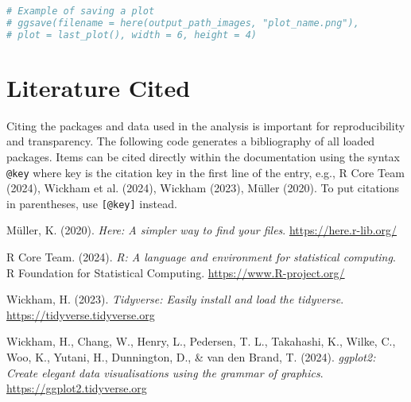 \documentclass[
  12pt,
]{article}
\newcommand{\passthrough}[1]{#1}
\newlength{\cslhangindent}
\newenvironment{CSLReferences}[2] %
 {\begin{list}{}{%
  \setlength{\itemindent}{0pt}
  \setlength{\leftmargin}{0pt}
  \setlength{\parsep}{0pt}
  \ifodd #1
   \setlength{\leftmargin}{\cslhangindent}
   \setlength{\itemindent}{-1\cslhangindent}
  \fi
  \setlength{\itemsep}{#2\baselineskip}}}
 {\end{list}}
\begin{document}
\begin{lstlisting}[language=R]
# Example of saving a plot
# ggsave(filename = here(output_path_images, "plot_name.png"), 
# plot = last_plot(), width = 6, height = 4)
\end{lstlisting}

\section{Literature Cited}\label{literature-cited}

Citing the packages and data used in the analysis is important for
reproducibility and transparency. The following code generates a
bibliography of all loaded packages. Items can be cited directly within
the documentation using the syntax \passthrough{\lstinline!@key!} where
key is the citation key in the first line of the entry, e.g., R Core
Team (2024), Wickham et al. (2024), Wickham (2023), Müller (2020). To
put citations in parentheses, use \passthrough{\lstinline![@key]!}
instead.

\label{refs}
\begin{CSLReferences}{1}{0}
Müller, K. (2020). \emph{Here: A simpler way to find your files}.
\url{https://here.r-lib.org/}

R Core Team. (2024). \emph{R: A language and environment for statistical
computing}. R Foundation for Statistical Computing.
\url{https://www.R-project.org/}

Wickham, H. (2023). \emph{Tidyverse: Easily install and load the
tidyverse}. \url{https://tidyverse.tidyverse.org}

Wickham, H., Chang, W., Henry, L., Pedersen, T. L., Takahashi, K.,
Wilke, C., Woo, K., Yutani, H., Dunnington, D., \& van den Brand, T.
(2024). \emph{ggplot2: Create elegant data visualisations using the
grammar of graphics}. \url{https://ggplot2.tidyverse.org}

\end{CSLReferences}
\end{document}
